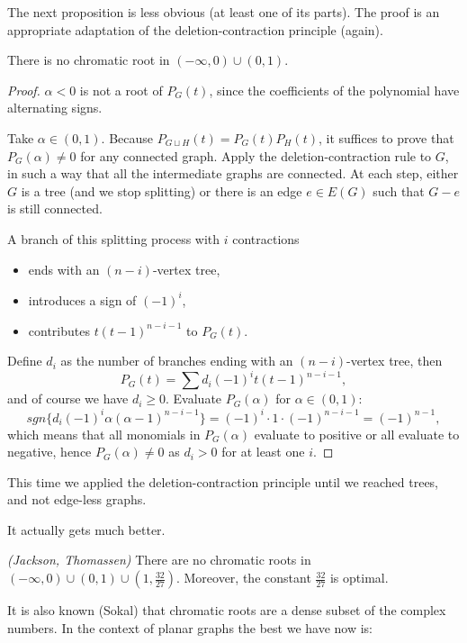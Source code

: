 The next proposition is less obvious (at least one of its parts). The proof is an appropriate adaptation of the deletion-contraction principle (again).

\begin{proposition} There is no chromatic root in $(- \infty, 0)\cup (0,1)$.
\end{proposition}

\begin{proof}
$\alpha <0$ is not a root of $P_G(t)$, since the coefficients of the polynomial have alternating signs.

Take $\alpha \in (0,1)$. Because $P_{G\sqcup H}(t)=P_G(t)P_H(t)$, it suffices to prove that $P_G(\alpha)\neq 0$ for any connected graph. Apply the deletion-contraction rule to $G$, in such a way that all the intermediate graphs are connected. At each step, either $G$ is a tree (and we stop splitting) or there is an edge $e\in E(G)$ such that $G-e$ is still connected.

A branch of this splitting process with $i$ contractions
\begin{itemize}
\item ends with an $(n-i)$-vertex tree,
\item introduces a sign of $(-1)^i$,
\item contributes $t(t-1)^{n-i-1}$ to $P_G(t)$.
\end{itemize}
Define $d_i$ as the number of branches ending with an $(n-i)$-vertex tree, then
$$P_G(t)=\sum d_i(-1)^it(t-1)^{n-i-1},$$
and of course we have $d_i\geqslant 0$.
Evaluate $P_G(\alpha)$ for $\alpha \in (0,1)$:
$$sgn\{d_i(-1)^i\alpha (\alpha-1)^{n-i-1} \}=(-1)^i\cdot 1\cdot (-1)^{n-i-1}=(-1)^{n-1},$$
which means that all monomials in $P_G(\alpha)$  evaluate to positive or all evaluate to negative, hence $P_G(\alpha) \neq 0$ as $d_i>0$ for at least one $i$. 
\end{proof}

This time we applied the deletion-contraction principle until we reached trees, and not edge-less graphs.

It actually gets much better.

\begin{theorem} \emph{(Jackson, Thomassen)}
There are no chromatic roots in $(- \infty, 0)\cup (0,1)\cup (1,\frac{32}{27}).$ Moreover, the constant $\frac{32}{27}$ is optimal. 
\end{theorem}

It is also known (Sokal) that chromatic roots are a dense subset of the complex numbers. In the context of planar graphs the best we have now is:

